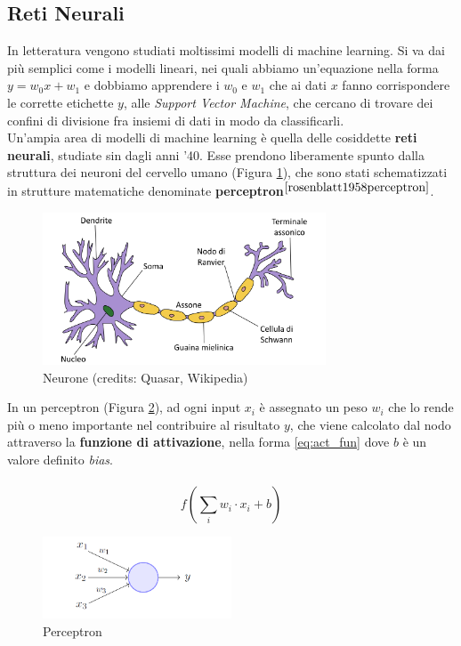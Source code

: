\subsection*{Reti Neurali} In letteratura vengono studiati moltissimi modelli di machine learning. Si va dai più semplici come i modelli lineari, nei quali abbiamo un'equazione nella forma $y = w_0x + w_1$ e dobbiamo apprendere i $w_0$ e $w_1$ che ai dati $x$ fanno corrispondere le corrette etichette $y$, alle \textit{Support Vector Machine}, che cercano di trovare dei confini di divisione fra insiemi di dati in modo da classificarli.\\
Un'ampia area di modelli di machine learning è quella delle cosiddette \textbf{reti neurali}, studiate sin dagli anni '40. Esse prendono liberamente spunto dalla struttura dei neuroni del cervello umano (Figura \ref{fig:neurone}), che sono stati schematizzati in strutture matematiche denominate \textbf{perceptron}$^{\cite{rosenblatt1958perceptron}}$.
\begin{figure}[h]
	\begin{center}
		\includegraphics[width=0.75\textwidth]{img/neurone.png}
		\caption{Neurone (credits: Quasar, Wikipedia)}
		\label{fig:neurone}
	\end{center}
\end{figure}
In un perceptron (Figura \ref{fig:perceptron}), ad ogni input $x_i$ è assegnato un peso $w_i$ che lo rende più o meno importante nel contribuire al risultato $y$, che viene calcolato dal nodo attraverso la \textbf{funzione di attivazione}, nella forma \ref{eq:act_fun} dove $b$ è un valore definito \textit{bias}.\\\\
\begin{equation}\label{eq:act_fun}
f\left(\sum_i w_i\cdot x_i + b\right)
\end{equation}
\begin{figure}[h]
	\begin{center}
		\includegraphics[width=0.5\textwidth]{img/perceptron.png}
		\caption{Perceptron}
		\label{fig:perceptron}
	\end{center}
\end{figure}
